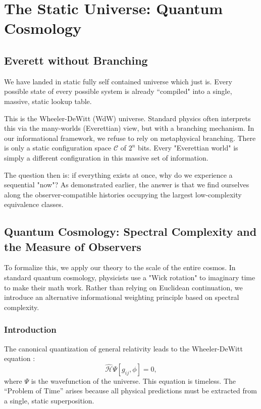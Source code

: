 \chapter{The Static Universe: Quantum Cosmology}
\label{chap:wdw}

\section{Everett without Branching}

We have landed in static fully self contained universe which just is. Every possible state of every possible system is already ``compiled" into a single, massive, static lookup table.

This is the Wheeler-DeWitt (WdW) universe. Standard physics often interprets this via the many-worlds (Everettian) view, but with a branching mechanism.
In our informational framework, we refuse to rely on metaphysical branching. There is only a static configuration space $\mathcal{C}$ of $2^n$ bits. Every "Everettian world" is simply a different
configuration in this massive set of information.

The question then is: if everything exists at once, why do we experience a sequential "now"?
As demonstrated earlier, the answer is that we find ourselves along the observer-compatible histories occupying the largest low-complexity equivalence classes.


\section{Quantum Cosmology: Spectral Complexity and the Measure of Observers}

To formalize this, we apply our theory to the scale of the entire cosmos.
In standard quantum cosmology, physicists use a "Wick rotation" to imaginary time to make their math work. 
Rather than relying on Euclidean continuation, we introduce an alternative informational weighting principle based on spectral complexity.


\subsection*{Introduction}

The canonical quantization of general relativity leads to the Wheeler-DeWitt equation \cite{dewitt1967}:
\begin{equation}
\hat{\mathcal{H}} \Psi[g_{ij}, \phi] = 0,
\end{equation}
where $\Psi$ is the wavefunction of the universe. This equation is timeless. The ``Problem of Time'' arises because all physical predictions must be extracted from a single, static superposition.

